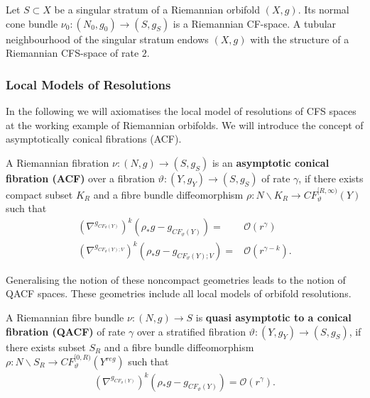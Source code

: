 \documentclass[psamsfonts]{amsart}
\theoremstyle{plain}
\theoremstyle{definition}{
\newtheorem{defi}{Definition}[section]
\newtheorem{ass}{Assumption}
\newtheorem*{nota}{Notation}}
\theoremstyle{remark}{
\newtheorem{rem}{Remark}
\newtheorem{ex}{Example}}
\theoremstyle{plain}{
\newtheorem{thm}{Theorem}[section]
\newtheorem{lem}{Lemma}[section]
\newtheorem{cor}{Corollary}[section]
\newtheorem{prop}{Proposition}[section]
\newtheorem{con}{Conjecture}[section]}
\begin{document}
\begin{lem}
    Let $S\subset X$ be a singular stratum of a Riemannian orbifold $(X,g)$. Its normal cone bundle $\nu_0\colon (N_0,g_0)\rightarrow (S,g_S)$ is a Riemannian CF-space. A tubular neighbourhood of the singular stratum endows $(X,g)$ with the structure of a Riemannian CFS-space of rate $2$.
\end{lem}


\subsubsection{Local Models of Resolutions}
\label{Local Models of Resolutions}

In the following we will axiomatises the local model of resolutions of CFS spaces at the working example of Riemannian orbifolds. We will introduce the concept of asymptotically conical fibrations (ACF).


\begin{defi}
A Riemannian fibration $\nu\colon (N,g)\rightarrow (S,g_S)$ is an \textbf{asymptotic conical fibration (ACF)} over a fibration $\vartheta\colon (Y,g_{Y})\rightarrow (S,g_S)$ of rate $\gamma$, if there exists compact subset $K_R$ and a fibre bundle diffeomorphism $\rho\colon N\backslash K_R\rightarrow CF^{[R,\infty)}_\vartheta(Y)$ such that
\begin{align*}
    (\nabla^{g_{CF_\vartheta(Y)}})^k\left(\rho_*g-g_{CF_\vartheta(Y)}\right)=&\mathcal{O}(r^{\gamma})\\
    (\nabla^{g_{CF_\vartheta(Y);V}})^k\left(\rho_*g-g_{CF_\vartheta(Y);V}\right)=&\mathcal{O}(r^{\gamma-k}).
\end{align*}
\end{defi}

Generalising the notion of these noncompact geometries leads to the notion of QACF spaces. These geometries include all local models of orbifold resolutions.

\begin{defi}
A Riemannian fibre bundle $\nu\colon (N,g)\rightarrow S$ is \textbf{quasi asymptotic to a conical fibration (QACF)} of rate $\gamma$ over a stratified fibration $\vartheta\colon (Y,g_{Y})\rightarrow (S,g_S)$, if there exists subset $S_R$ and a fibre bundle diffeomorphism $\rho\colon N\backslash S_R\rightarrow CF^{[0,R)}_\vartheta(Y^{reg})$ such that 
\begin{align*}
    (\nabla^{g_{CF_\vartheta(Y)}})^k\left(\rho_{*}g-g_{CF_\vartheta(Y)}\right)=\mathcal{O}(r^{\gamma}).
\end{align*}
\end{defi}
\end{document}
